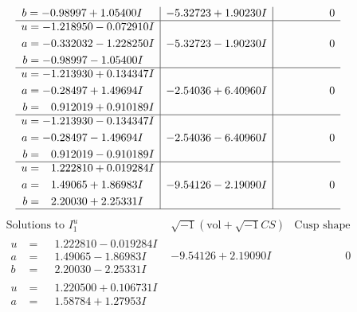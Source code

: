 \documentclass[1p]{elsarticle_modified}
\theoremstyle{definition}
\newcommand{\I}{\sqrt{-1}}
\begin{document}
$$\begin{array}{c|c|c}
\begin{aligned}
b &= -0.98997 + 1.05400 I\end{aligned}
 & -5.32723 + 1.90230 I & \phantom{-0.000000 } 0 \\ \hline\begin{aligned}
u &= -1.218950 - 0.072910 I \\
a &= -0.332032 - 1.228250 I \\
b &= -0.98997 - 1.05400 I\end{aligned}
 & -5.32723 - 1.90230 I & \phantom{-0.000000 } 0 \\ \hline\begin{aligned}
u &= -1.213930 + 0.134347 I \\
a &= -0.28497 + 1.49694 I \\
b &= \phantom{-}0.912019 + 0.910189 I\end{aligned}
 & -2.54036 + 6.40960 I & \phantom{-0.000000 } 0 \\ \hline\begin{aligned}
u &= -1.213930 - 0.134347 I \\
a &= -0.28497 - 1.49694 I \\
b &= \phantom{-}0.912019 - 0.910189 I\end{aligned}
 & -2.54036 - 6.40960 I & \phantom{-0.000000 } 0 \\ \hline\begin{aligned}
u &= \phantom{-}1.222810 + 0.019284 I \\
a &= \phantom{-}1.49065 + 1.86983 I \\
b &= \phantom{-}2.20030 + 2.25331 I\end{aligned}
 & -9.54126 - 2.19090 I & \phantom{-0.000000 } 0\\
 \hline 
 \end{array}$$\newpage$$\begin{array}{c|c|c}  
\text{Solutions to }I^u_{1}& \I (\text{vol} + \sqrt{-1}CS) & \text{Cusp shape}\\
 \hline 
\begin{aligned}
u &= \phantom{-}1.222810 - 0.019284 I \\
a &= \phantom{-}1.49065 - 1.86983 I \\
b &= \phantom{-}2.20030 - 2.25331 I\end{aligned}
 & -9.54126 + 2.19090 I & \phantom{-0.000000 } 0 \\ \hline\begin{aligned}
u &= \phantom{-}1.220500 + 0.106731 I \\
a &= \phantom{-}1.58784 + 1.27953 I \\

\end{aligned}
\end{array}$$
\end{document}
